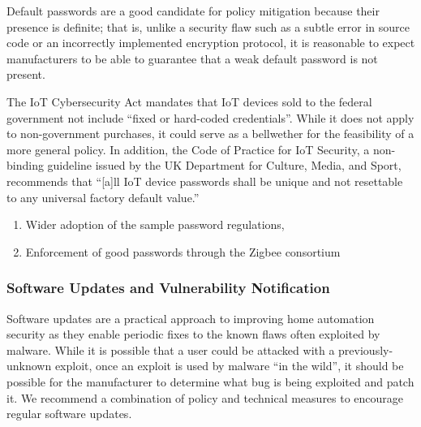  Default passwords are a good candidate for policy mitigation because their presence is definite; that is, unlike a security flaw such as a subtle error in source code or an incorrectly implemented encryption protocol, it is reasonable to expect manufacturers to be able to guarantee that a weak default password is not present. 

 The IoT Cybersecurity Act mandates that IoT devices sold to the federal government not include “fixed or hard-coded credentials”. While it does not apply to non-government purchases, it could serve as a bellwether for the feasibility of a more general policy. In addition, the Code of Practice for IoT Security, a non-binding guideline issued by the UK Department for Culture, Media, and Sport, recommends that “[a]ll IoT device passwords shall be unique and not resettable to any universal factory default value.” 

\begin{enumerate}
\item Wider adoption of the sample password regulations,
\item Enforcement of good passwords through the Zigbee consortium
\end{enumerate}



\subsubsection{Software Updates and Vulnerability Notification}
Software updates are a practical approach to improving home automation security as they enable periodic fixes to the known flaws often exploited by malware. While it is possible that a user could be attacked with a previously-unknown exploit, once an exploit is used by malware “in the wild”, it should be possible for the manufacturer to determine what bug is being exploited and patch it. We recommend a combination of policy and technical measures to encourage regular software updates.

